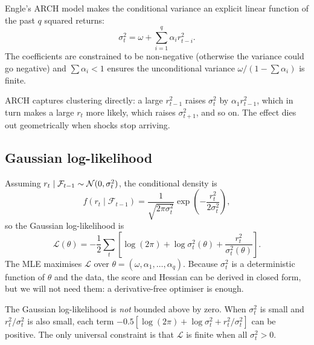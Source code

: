 
Engle's ARCH model makes the conditional variance an explicit linear function
of the past $q$ squared returns:
\[
\sigma_t^2 = \omega + \sum_{i=1}^q \alpha_i r_{t-i}^2.
\]
The coefficients are constrained to be non-negative (otherwise the variance
could go negative) and $\sum \alpha_i < 1$ ensures the unconditional variance
$\omega / (1 - \sum \alpha_i)$ is finite.

ARCH captures clustering directly: a large $r_{t-1}^2$ raises $\sigma_t^2$ by
$\alpha_1 r_{t-1}^2$, which in turn makes a large $r_t$ more likely, which
raises $\sigma_{t+1}^2$, and so on. The effect dies out geometrically when
shocks stop arriving.

\subsection{Gaussian log-likelihood}

Assuming $r_t \mid \mathcal{F}_{t-1} \sim \mathcal{N}(0, \sigma_t^2)$, the
conditional density is
\[
f(r_t \mid \mathcal{F}_{t-1}) = \frac{1}{\sqrt{2\pi\sigma_t^2}}
  \exp\!\left(-\frac{r_t^2}{2\sigma_t^2}\right),
\]
so the Gaussian log-likelihood is
\[
\mathcal{L}(\theta) = -\frac{1}{2} \sum_t
  \left[ \log(2\pi) + \log\sigma_t^2(\theta) + \frac{r_t^2}{\sigma_t^2(\theta)} \right].
\]
The MLE maximises $\mathcal{L}$ over $\theta = (\omega, \alpha_1, \ldots,
\alpha_q)$. Because $\sigma_t^2$ is a deterministic function of $\theta$ and
the data, the score and Hessian can be derived in closed form, but we will
not need them: a derivative-free optimiser is enough.

\begin{warning}
The Gaussian log-likelihood is \emph{not} bounded above by zero. When
$\sigma_t^2$ is small and $r_t^2 / \sigma_t^2$ is also small, each term
$-0.5[\log(2\pi) + \log\sigma_t^2 + r_t^2/\sigma_t^2]$ can be positive. The
only universal constraint is that $\mathcal{L}$ is finite when all
$\sigma_t^2 > 0$.
\end{warning}

